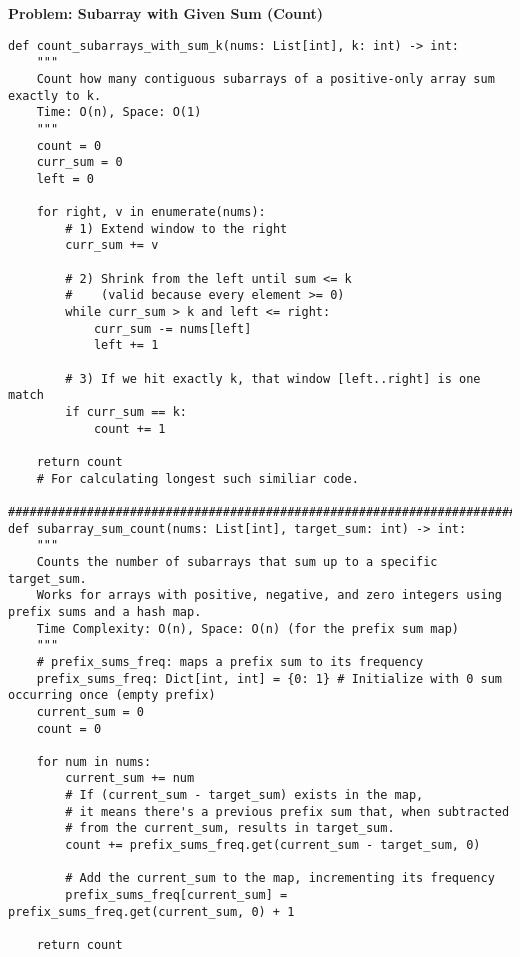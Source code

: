 \noindent\textbf{Problem: Subarray with Given Sum (Count)}
\begin{verbatim}
def count_subarrays_with_sum_k(nums: List[int], k: int) -> int:
    """
    Count how many contiguous subarrays of a positive-only array sum exactly to k.
    Time: O(n), Space: O(1)
    """
    count = 0
    curr_sum = 0
    left = 0

    for right, v in enumerate(nums):
        # 1) Extend window to the right
        curr_sum += v

        # 2) Shrink from the left until sum <= k
        #    (valid because every element >= 0)
        while curr_sum > k and left <= right:
            curr_sum -= nums[left]
            left += 1

        # 3) If we hit exactly k, that window [left..right] is one match
        if curr_sum == k:
            count += 1

    return count
    # For calculating longest such similiar code. 
    ####################################################################################
def subarray_sum_count(nums: List[int], target_sum: int) -> int:
    """
    Counts the number of subarrays that sum up to a specific target_sum.
    Works for arrays with positive, negative, and zero integers using prefix sums and a hash map. 
    Time Complexity: O(n), Space: O(n) (for the prefix sum map)
    """
    # prefix_sums_freq: maps a prefix sum to its frequency
    prefix_sums_freq: Dict[int, int] = {0: 1} # Initialize with 0 sum occurring once (empty prefix)
    current_sum = 0
    count = 0

    for num in nums:
        current_sum += num
        # If (current_sum - target_sum) exists in the map,
        # it means there's a previous prefix sum that, when subtracted
        # from the current_sum, results in target_sum.
        count += prefix_sums_freq.get(current_sum - target_sum, 0)
        
        # Add the current_sum to the map, incrementing its frequency
        prefix_sums_freq[current_sum] = prefix_sums_freq.get(current_sum, 0) + 1
        
    return count
\end{verbatim}

